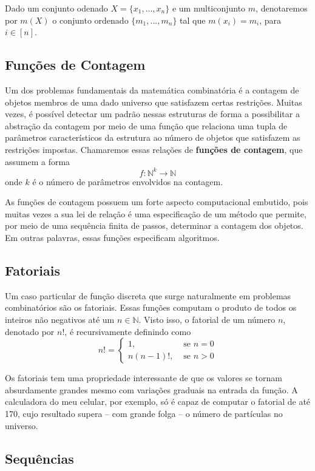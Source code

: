 Dado um conjunto odenado $X = \{x_1, \ldots, x_n\}$ e um multiconjunto $m$,
denotaremos por $m(X)$ o conjunto ordenado $\{m_1, \ldots, m_n\}$ tal que
$m(x_i) = m_i$, para $i \in [n]$.

\subsection{Funções de Contagem}

Um dos problemas fundamentais da matemática combinatória é a contagem de objetos
membros de uma dado universo que satisfazem certas restrições. Muitas vezes,
é possível detectar um padrão nessas estruturas de forma a possibilitar
a abstração da contagem por meio de uma função que relaciona uma tupla de
parâmetros característicos da estrutura ao número de objetos que satisfazem as
restrições impostas. Chamaremos essas relações de \textbf{funções de contagem}, que
assumem a forma
\[
  f: \mathbb{N}^k \to \mathbb{N}
\]
onde $k$ é o número de parâmetros envolvidos na contagem.

As funções de contagem possuem um forte aspecto computacional embutido, pois
muitas vezes a sua lei de relação é uma especificação de um método que permite,
por meio de uma sequência finita de passos, determinar a contagem dos objetos.
Em outras palavras, essas funções especificam algoritmos.

\subsection{Fatoriais}

Um caso particular de função discreta que surge naturalmente em problemas
combinatórios são os fatoriais. Essas funções computam o produto de todos
os inteiros não negativos até um $n \in \mathbb{N}$. Visto isso, o fatorial
de um número $n$, denotado por $n!$, é recursivamente definindo como
\[
  n! = \begin{cases}
    1,       &\text{ se } n = 0\\
    n(n-1)!, &\text{ se } n > 0
  \end{cases}
\]

Os fatoriais tem uma propriedade interessante de que os valores se tornam
absurdamente grandes mesmo com variações graduais na entrada da função. A
calculadora do meu celular, por exemplo, só é capaz de computar o fatorial de
até 170, cujo resultado supera -- com grande folga -- o número de partículas
no universo.

\subsection{Sequências}

